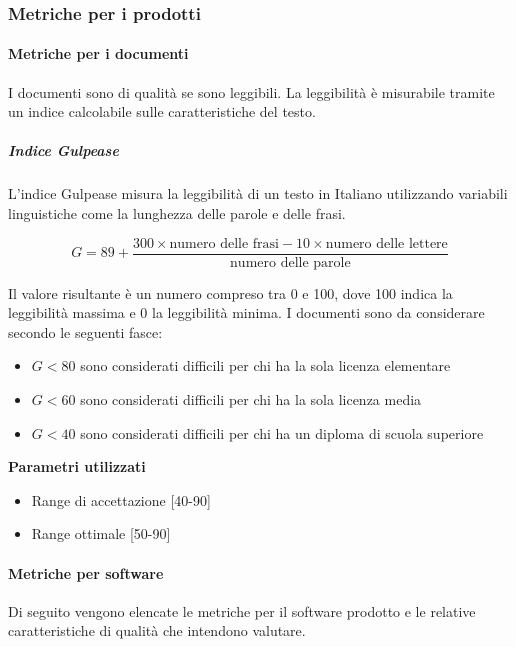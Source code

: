 \subsubsection{Metriche per i prodotti}

\paragraph{Metriche per i documenti}
I documenti sono di qualità se sono leggibili. La leggibilità è
misurabile tramite un indice calcolabile sulle caratteristiche del
testo.

\subparagraph{Indice Gulpease}
L'indice Gulpease misura la leggibilità di un testo in Italiano
utilizzando variabili linguistiche come la lunghezza delle parole e
delle frasi.

$$
G = 89 + \frac{300 \times \text{numero delle frasi} - 10 \times \text{numero delle lettere}}{\text{numero
    delle parole}}
$$

Il valore risultante è un numero compreso tra 0 e 100, dove 100 indica
la leggibilità massima e 0 la leggibilità minima. I documenti sono da
considerare secondo le seguenti fasce:
\begin{itemize}
\item $ G < 80 $ sono considerati difficili per chi ha la sola licenza
  elementare
\item $ G < 60 $ sono considerati difficili per chi ha la sola licenza
  media
\item $ G < 40 $ sono considerati difficili per chi ha un diploma di
  scuola  superiore
\end{itemize}

\textbf{Parametri utilizzati}\\
\begin{itemize}
\item Range di accettazione [40-90]
\item Range ottimale [50-90]
\end{itemize}







\paragraph{Metriche per software}
Di seguito vengono elencate le metriche per il software prodotto e le relative caratteristiche di
qualità che intendono valutare.

